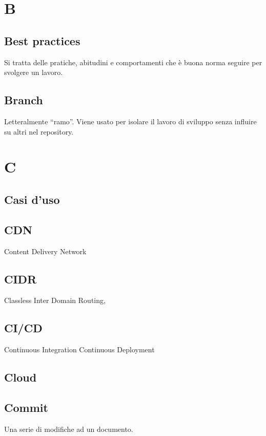 \documentclass{classes/base}
\begin{document}
        \newpage  
    \section*{B}
        
        \subsection*{Best practices} 
        Si tratta delle pratiche, abitudini e comportamenti che è buona norma seguire per svolgere un lavoro.

        \subsection*{Branch} 
        Letteralmente “ramo”. Viene usato per isolare il lavoro di sviluppo senza influire su altri nel repository. 
        \newpage  
    \section*{C}
        \subsection*{Casi d’uso} 

        \subsection*{CDN}
        Content Delivery Network
    
        \subsection*{CIDR}
        Classless Inter Domain Routing, 
    
        \subsection*{CI/CD}
        Continuous Integration Continuous Deployment 
    
        \subsection*{Cloud}
    
        \subsection*{Commit}
        Una serie di modifiche ad un documento. 
        \newpage  
\end{document}

